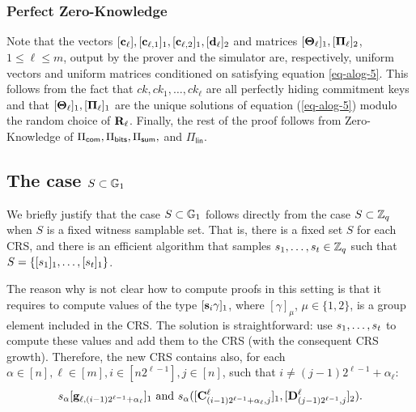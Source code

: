 \subsubsection{Perfect Zero-Knowledge}
Note that the vectors \([\mathbf{c}_\ell],[\mathbf{c}_{\ell,1}]_1,[\mathbf{c}_{\ell,2}]_1,[\mathbf{d}_\ell]_2\) and matrices \([\mathbf{{\Theta}}_\ell]_1,[\mathbf{{\Pi}}_\ell]_2\), \(1\leq\ell\leq m\), output by the prover and the simulator are, respectively, uniform vectors and uniform matrices conditioned on satisfying equation \ref{eq-alog-5}. This follows from the fact that \(ck,ck_1,\ldots,ck_\ell\) are all perfectly hiding commitment keys and that \([\mathbf{{\Theta}}_\ell]_1,[\mathbf{{\Pi}}_\ell]_1\) are the unique solutions of equation (\ref{eq-alog-5}) modulo the random choice of \(\mathbf{{R}}_\ell\). Finally, the rest of the proof follows from Zero-Knowledge of \(\Pi_{\mathsf{com}},\Pi_{\mathsf{bits}},\Pi_{\mathsf{sum}},\) and \(\Pi_\mathsf{lin}\).

\subsection{The case \(S\subset\mathbb{G}_1\)} \label{sec:improved-aZKSMP-group-case}
We briefly justify that the case \(S\subset\mathbb{G}_1\) follows directly from the case \(S\subset\mathbb{Z}_q\) when \(S\) is a fixed witness samplable set. That is, there is a fixed set $S$ for each CRS, and there is an efficient algorithm that samples \(s_1,\ldots,s_{t }\in\mathbb{Z}_q\) such that \(S=\{[s_1]_1,\ldots,[s_{t }]_1\}\). %

The reason why is not clear how to compute proofs in this setting is that it requires to compute values of the type \([\mathbf{s}_i \gamma]_1\), where \([\gamma]_\mu\), \(\mu\in\{1,2\}\), is a group element included in the CRS. The solution is straightforward: use \(s_1,\ldots,s_{t }\) to compute these values and add them to the CRS (with the consequent CRS growth). Therefore, the new CRS contains also, for each $\alpha\in[n],\ell\in[m],i\in[n2^{\ell-1}],j\in[n]$, such that $i\neq(j-1)2^{\ell-1}+\alpha_\ell$:
\begin{align*}
s_\alpha[\mathbf{g}_{\ell,(i-1)2^{\ell-1}+\alpha_\ell}]_1 \text{ and }
 s_\alpha([\mathbf{{C}}^\ell_{(i-1)2^{\ell-1}+\alpha_\ell,j}]_1,[\mathbf{{D}}_{(j-1)2^{\ell-1},j}^\ell]_2).
\end{align*}


